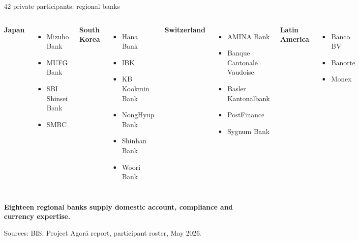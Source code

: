 \documentclass[aspectratio=169,12pt]{beamer}
\newcommand{\rust}[1]{\textcolor{Rust}{\textbf{#1}}}
\newcommand{\blue}[1]{\textcolor{Ocean}{\textbf{#1}}}
\newcommand{\source}[1]{\vfill\par\fontsize{5.4}{6.5}\selectfont\color{Quiet}Sources: #1}
\newcommand{\verytightitems}{\setlength{\itemsep}{0.22em}\setlength{\parskip}{0pt}}
\begin{document}
\begin{frame}[shrink=12]{42 private participants: regional banks}
  \fontsize{8.9}{10.7}\selectfont
  \begin{columns}[T,onlytextwidth]
      \rust{Japan}
      \begin{itemize}\verytightitems
        \item Mizuho Bank
        \item MUFG Bank
        \item SBI Shinsei Bank
        \item SMBC
      \end{itemize}
      \blue{South Korea}
      \begin{itemize}\verytightitems
        \item Hana Bank
        \item IBK
        \item KB Kookmin Bank
        \item NongHyup Bank
        \item Shinhan Bank
        \item Woori Bank
      \end{itemize}
      \rust{Switzerland}
      \begin{itemize}\verytightitems
        \item AMINA Bank
        \item Banque Cantonale Vaudoise
        \item Basler Kantonalbank
        \item PostFinance
        \item Sygnum Bank
      \end{itemize}
      \blue{Latin America}
      \begin{itemize}\verytightitems
        \item Banco BV
        \item Banorte
        \item Monex
      \end{itemize}
  \end{columns}
  \vspace{0.08cm}
  {\fontsize{8.8}{10.5}\selectfont\bfseries Eighteen regional banks supply domestic account, compliance and currency expertise.\par}
  \source{BIS, Project Agor\'a report, participant roster, May 2026.}
\end{frame}
\end{document}
